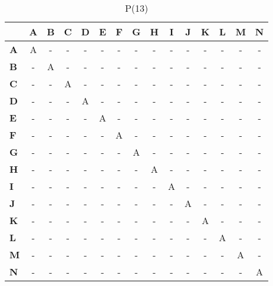 \documentclass{article}
\begin{document}
\begin{table}[H]\centering
\caption{P(13)}
\begin{tabular}{l c c c c c c c c c c c c c c}
\toprule
 & \textbf{A} & \textbf{B} & \textbf{C} & \textbf{D} & \textbf{E} & \textbf{F} & \textbf{G} & \textbf{H} & \textbf{I} & \textbf{J} & \textbf{K} & \textbf{L} & \textbf{M} & \textbf{N}\\\midrule
\textbf{A} & A & - & - & - & - & - & - & - & - & - & - & - & - & - \\
\textbf{B} & - & A & - & - & - & - & - & - & - & - & - & - & - & - \\
\textbf{C} & - & - & A & - & - & - & - & - & - & - & - & - & - & - \\
\textbf{D} & - & - & - & A & - & - & - & - & - & - & - & - & - & - \\
\textbf{E} & - & - & - & - & A & - & - & - & - & - & - & - & - & - \\
\textbf{F} & - & - & - & - & - & A & - & - & - & - & - & - & - & - \\
\textbf{G} & - & - & - & - & - & - & A & - & - & - & - & - & - & - \\
\textbf{H} & - & - & - & - & - & - & - & A & - & - & - & - & - & - \\
\textbf{I} & - & - & - & - & - & - & - & - & A & - & - & - & - & - \\
\textbf{J} & - & - & - & - & - & - & - & - & - & A & - & - & - & - \\
\textbf{K} & - & - & - & - & - & - & - & - & - & - & A & - & - & - \\
\textbf{L} & - & - & - & - & - & - & - & - & - & - & - & A & - & - \\
\textbf{M} & - & - & - & - & - & - & - & - & - & - & - & - & A & - \\
\textbf{N} & - & - & - & - & - & - & - & - & - & - & - & - & - & A \\
\bottomrule
\end{tabular}
\end{table}
\end{document}
